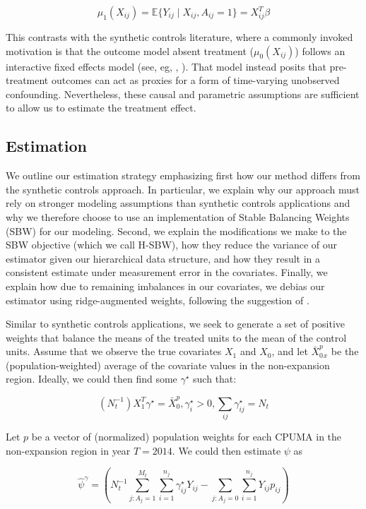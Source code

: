 \documentclass[12pt]{article}
\begin{document}
$$
\mu_1(X_{ij}) = \mathbb{E}\{Y_{ij} \mid X_{ij}, A_{ij} = 1\} = X_{ij}^T\beta
$$

This contrasts with the synthetic controls literature, where a commonly invoked motivation is that the outcome model absent treatment ($\mu_0(X_{ij})$) follows an interactive fixed effects model (see, eg, \cite{abadie2010synthetic}, \cite{ben2018augmented}). That model instead posits that pre-treatment outcomes can act as proxies for a form of time-varying unobserved confounding. Nevertheless, these causal and parametric assumptions are sufficient to allow us to estimate the treatment effect. 

\subsection{Estimation}

We outline our estimation strategy emphasizing first how our method differs from the synthetic controls approach. In particular, we explain why our approach must rely on stronger modeling assumptions than synthetic controls applications and why we therefore choose to use an implementation of Stable Balancing Weights (SBW) for our modeling. Second, we explain the modifications we make to the SBW objective (which we call H-SBW), how they reduce the variance of our estimator given our hierarchical data structure, and how they result in a consistent estimate under measurement error in the covariates. Finally, we explain how due to remaining imbalances in our covariates, we debias our estimator using ridge-augmented weights, following the suggestion of \cite{ben2018augmented}.

Similar to synthetic controls applications, we seek to generate a set of positive weights that balance the means of the treated units to the mean of the control units. Assume that we observe the true covariates $X_1$ and $X_0$, and let $\bar{X}_0^p_x$ be the (population-weighted) average of the covariate values in the non-expansion region. Ideally, we could then find some $\gamma^\star$ such that: 

$$
(N_t^{-1})X_1^T\gamma^\star = \bar{X}_0^p, \gamma_i^\star > 0, \sum_{ij} \gamma_{ij}^\star = N_t
$$

Let $p$ be a vector of (normalized) population weights for each CPUMA in the non-expansion region in year $T = 2014$. We could then estimate $\psi$ as

$$
\hat{\psi}^{\gamma} = (N_t^{-1}\sum_{j: A_j = 1}^{M_t}\sum_{i = 1}^{n_j}\gamma_{ij}^\star Y_{ij} - \sum_{j: A_j = 0}\sum_{i = 1}^{n_j}Y_{ij}p_{ij})
$$
\end{document}
